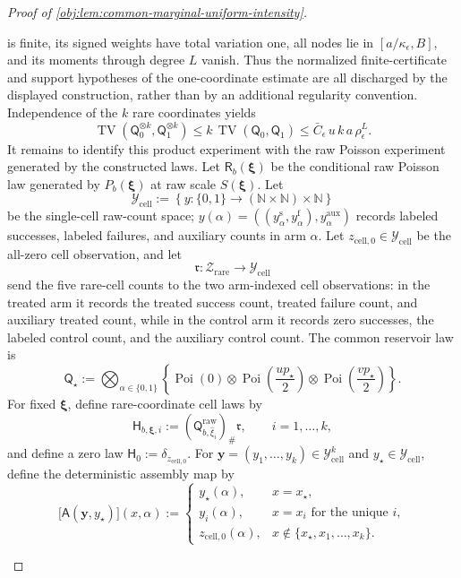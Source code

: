 \begin{proof}[Proof of \cref{obj:lem:common-marginal-uniform-intensity}]
\begin{enumerate}
is finite, its signed weights have total variation one, all nodes lie in
\([a/\kappa_\epsilon,B]\), and its moments through degree \(L\) vanish. Thus the normalized
finite-certificate and support hypotheses of the one-coordinate estimate are all discharged by the
displayed construction, rather than by an additional regularity convention.
Independence of the \(k\) rare coordinates yields
\[
\operatorname{TV}\!\left(\mathsf Q_0^{\otimes k},\mathsf Q_1^{\otimes k}\right)
\le
k\,\operatorname{TV}(\mathsf Q_0,\mathsf Q_1)
\le
\bar C_\epsilon\,u\,k\,a\,\rho_\epsilon^L .
\]
It remains to identify this product experiment with the raw Poisson experiment generated by the constructed laws. Let \(\mathsf R_b(\boldsymbol\xi)\) be the conditional raw Poisson law generated by \(P_b(\boldsymbol\xi)\) at raw scale \(S(\boldsymbol\xi)\). Let
\[
\mathcal Y_{\mathrm{cell}}
:=
\left\{y:\{0,1\}\to(\mathbb N\times\mathbb N)\times\mathbb N\right\}
\]
be the single-cell raw-count space; \(y(\alpha)=((y^{\mathrm{s}}_\alpha,y^{\mathrm{f}}_\alpha),y^{\mathrm{aux}}_\alpha)\) records labeled successes, labeled failures, and auxiliary counts in arm \(\alpha\). Let \(z_{\mathrm{cell},0}\in\mathcal Y_{\mathrm{cell}}\) be the all-zero cell observation, and let
\[
\mathfrak r:\mathcal Z_{\mathrm{rare}}\to\mathcal Y_{\mathrm{cell}}
\]
send the five rare-cell counts to the two arm-indexed cell observations: in the treated arm it records the treated success count, treated failure count, and auxiliary treated count, while in the control arm it records zero successes, the labeled control count, and the auxiliary control count. The common reservoir law is
\[
\mathsf Q_\star
:=
\bigotimes_{\alpha\in\{0,1\}}
\left
\{\operatorname{Poi}(0)\otimes
\operatorname{Poi}\left(\frac{u p_\star}{2}\right)\otimes
\operatorname{Poi}\left(\frac{v p_\star}{2}\right)\right\}.
\]
For fixed \(\boldsymbol\xi\), define rare-coordinate cell laws by
\[
\mathsf H_{b,\boldsymbol\xi,i}
:=
(\mathsf Q^{\mathrm{raw}}_{b,\widehat\xi_i})_\#\mathfrak r,
\qquad i=1,\ldots,k,
\]
and define a zero law \(\mathsf H_0:=\delta_{z_{\mathrm{cell},0}}\). For \(\boldsymbol y=(y_1,\ldots,y_k)\in\mathcal Y_{\mathrm{cell}}^k\) and \(y_\star\in\mathcal Y_{\mathrm{cell}}\), define the deterministic assembly map by
\[
\bigl[\mathsf A(\boldsymbol y,y_\star)\bigr](x,\alpha)
:=
\begin{cases}
y_\star(\alpha), & x=x_\star,\\
y_i(\alpha), & x=x_i\text{ for the unique }i,\\
z_{\mathrm{cell},0}(\alpha), & x\notin\{x_\star,x_1,\ldots,x_k\}.

\end{cases}\]
\end{enumerate}
\end{proof}
